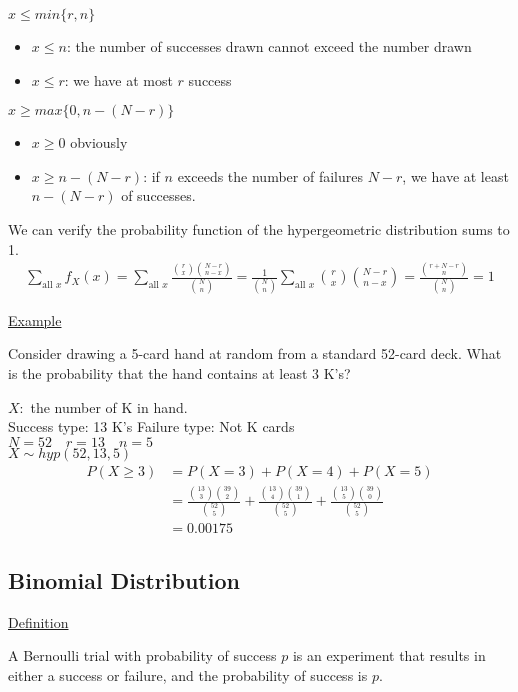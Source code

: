 \documentclass{article}
\begin{document}
$x \le min\{r,n\}$
\begin{itemize}
    \item $x \le n$: the number of successes drawn cannot exceed the number drawn
    \item $x \le r$: we have at most $r$ success
\end{itemize}

$x \ge max\{0,n-(N-r)\}$
\begin{itemize}
    \item $x \ge 0$ obviously
    \item $x \ge n - (N-r)$: if $n$ exceeds the number of failures $N-r$, we have at least $n-(N-r)$ of successes. 
\end{itemize}

We can verify the probability function of the hypergeometric distribution sums to 1.
\begin{align*}
    \sum_{\text{all }x}f_X(x) = \sum_{\text{all }x}\frac{\binom{r}{x}\binom{N-r}{n-x}}{\binom{N}{n}} = \frac{1}{\binom{N}{n}}\sum_{\text{all }x}\binom{r}{x}\binom{N-r}{n-x} = \frac{\binom{r+N-r}{n}}{\binom{N}{n}} = 1
\end{align*}

\underline{Example}

Consider drawing a 5-card hand at random from a standard 52-card deck. What is the probability that the hand contains at least 3 K's? 

$X: $ the number of K in hand.\\
Success type: 13 K's \quad Failure type: Not K cards\\
$N = 52 \quad r = 13 \quad n = 5$\\
$X \sim hyp(52,13,5)$
\begin{align*}
    P(X \ge 3) &= P(X = 3) + P(X = 4) + P(X = 5)\\
    &= \frac{\binom{13}{3}\binom{39}{2}}{\binom{52}{5}} + \frac{\binom{13}{4}\binom{39}{1}}{\binom{52}{5}} + \frac{\binom{13}{5}\binom{39}{0}}{\binom{52}{5}} \\
    &= 0.00175
\end{align*}

\subsection{Binomial Distribution}

\underline{Definition}

A Bernoulli trial with probability of success $p$ is an experiment that results in either a success or failure, and the probability of success is $p$.
\end{document}
